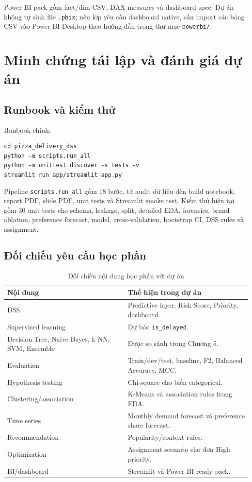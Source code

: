 \documentclass[12pt,a4paper,oneside]{report}
\newcommand{\code}[1]{\nolinkurl{#1}}
\begin{document}
Power BI pack gồm fact/dim CSV, DAX measures và dashboard spec. Dự án không tự
sinh file \code{.pbix}; nếu lớp yêu cầu dashboard native, cần import các bảng
CSV vào Power BI Desktop theo hướng dẫn trong thư mục \code{powerbi/}.

\chapter{Minh chứng tái lập và đánh giá dự án}

\section{Runbook và kiểm thử}

Runbook chính:

\begin{verbatim}
cd pizza_delivery_dss
python -m scripts.run_all
python -m unittest discover -s tests -v
streamlit run app/streamlit_app.py
\end{verbatim}

Pipeline \code{scripts.run\_all} gồm 18 bước, từ audit dữ liệu đến build
notebook, report PDF, slide PDF, unit tests và Streamlit smoke test. Kiểm thử
hiện tại gồm 30 unit tests cho schema, leakage, split, detailed EDA, forensics, brand
ablation, preference forecast, model, cross-validation, bootstrap CI, DSS rules
và assignment.

\section{Đối chiếu yêu cầu học phần}

\begin{table}[H]
\centering
\small
\caption{Đối chiếu nội dung học phần với dự án}
\begin{tabularx}{\textwidth}{p{4.0cm}X}
\toprule
Nội dung & Thể hiện trong dự án\\
\midrule
DSS & Predictive layer, Risk Score, Priority, dashboard.\\
Supervised learning & Dự báo \code{is\_delayed}.\\
Decision Tree, Naive Bayes, k-NN, SVM, Ensemble & Được so sánh trong Chương 5.\\
Evaluation & Train/dev/test, baseline, F2, Balanced Accuracy, MCC.\\
Hypothesis testing & Chi-square cho biến categorical.\\
Clustering/association & K-Means và association rules trong EDA.\\
Time series & Monthly demand forecast và preference share forecast.\\
Recommendation & Popularity/context rules.\\
Optimization & Assignment scenario cho đơn High priority.\\
BI/dashboard & Streamlit và Power BI-ready pack.\\
\bottomrule
\end{tabularx}
\end{table}
\end{document}
